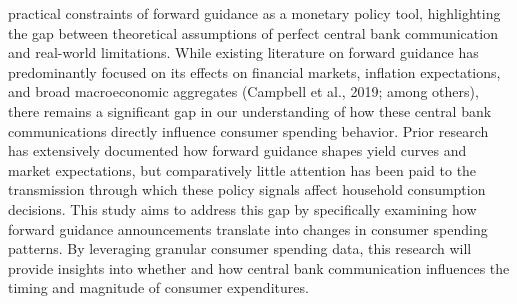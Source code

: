 \documentclass[12pt,english]{article}
\begin{document}
practical constraints of forward guidance as a monetary policy tool, highlighting the gap between theoretical assumptions of perfect central bank communication and real-world limitations. While existing literature on forward guidance has predominantly focused on its effects on financial markets, inflation expectations, and broad macroeconomic aggregates (Campbell et al., 2019; among others), there remains a significant gap in our understanding of how these central bank communications directly influence consumer spending behavior. Prior research has extensively documented how forward guidance shapes yield curves and market expectations, but comparatively little attention has been paid to the transmission through which these policy signals affect household consumption decisions. This study aims to address this gap by specifically examining how forward guidance announcements translate into changes in consumer spending patterns. By leveraging granular consumer spending data, this research will provide insights into whether and how central bank communication influences the timing and magnitude of consumer expenditures.
\end{document}
